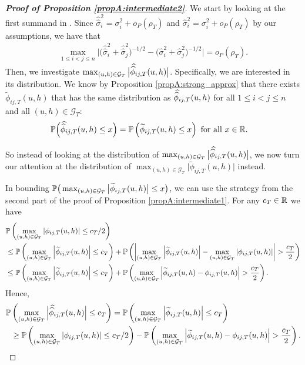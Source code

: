 \documentclass[a4paper,12pt]{article}
\makeatletter
\renewcommand{\eqref}[1]{\tagform@{\ref{#1}}}
\newcommand{\doublehat}[1]{\skew{5.5}\widehat{\widehat{#1}}}
\newcommand{\doublehattwo}[1]{\widehat{\widehat{#1}}}
\makeatother
\begin{document}
\begin{proof}[\textnormal{\textbf{Proof of Proposition \ref{propA:intermediate2}}}]
We start by looking at the first summand in \eqref{ineq-diff-1}. Since $\doublehattwo{\sigma}_i^2 = \sigma_i^2 + o_P(\rho_T)$ and $\widehat{\sigma}_i^2 = \sigma_i^2 + o_P(\rho_T)$ by our assumptions, we have that 
\begin{align}\label{ineq-diff-2}
\max_{1 \le i < j \le n} \Big|\big(\doublehattwo{\sigma}_i^2 + \doublehattwo{\sigma}_j^2 \big)^{-1/2} - \big(\widehat{\sigma}_i^2 + \widehat{\sigma}_j^2 \big)^{-1/2}\Big| = o_P(\rho_T).
\end{align}
Then, we investigate $ \max_{(u,h) \in \mathcal{G}_T} \big|\doublehat{\phi}_{ij,T}(u,h)\big|$. Specifically, we are interested in its distribution. We know by Proposition \ref{propA:strong_approx} that there exists $\widetilde{\phi}_{ij, T}(u, h)$ that has the same distribution as $\doublehat{\phi}_{ij,T}(u,h)$ for all $1\le i < j \le n$ and all $(u, h) \in \mathcal{G}_T$:
\begin{align*}
\pr&\Big(\doublehat{\phi}_{ij, T}(u, h) \leq x\Big) = \pr\left(\widetilde{\phi}_{ij, T}(u, h) \leq x\right) \text{ for all } x \in \reals.
\end{align*}

So instead of looking at the distribution of $ \max_{(u,h) \in \mathcal{G}_T} \big|\doublehat{\phi}_{ij,T}(u,h)\big|$, we now turn our attention at the distribution of $ \max_{(u,h) \in \mathcal{G}_T}\big|\widetilde{\phi}_{ij, T}(u, h)\big|$ instead.

In bounding $\mathbb{P}\big( \max_{(u,h) \in \mathcal{G}_T} \big| \widetilde{\phi}_{ij, T}(u, h) \big|\leq x\big)$, we can use the strategy from the second part of the proof of Proposition \ref{propA:intermediate1}. For any $c_T \in \mathbb{R}$ we have
\begin{align*}
&\mathbb{P}\left( \max_{(u,h) \in \mathcal{G}_T}\left|\phi_{ij, T}(u, h)\right| \leq c_T/2\right) \\
&\leq \mathbb{P}\left( \max_{(u,h) \in \mathcal{G}_T}\left|\widetilde{\phi}_{ij, T}(u, h)\right| \leq c_T\right) + \mathbb{P}\left(\left|\max_{(u,h) \in \mathcal{G}_T}\left|\widetilde{\phi}_{ij, T}(u, h)\right| - \max_{(u,h) \in \mathcal{G}_T}\left|\phi_{ij, T}(u, h)\right| \right| > \frac{c_T}{2}\right) \\
&\leq \mathbb{P}\left( \max_{(u,h) \in \mathcal{G}_T}\left|\widetilde{\phi}_{ij, T}(u, h)\right| \leq c_T\right) + \mathbb{P}\left(\max_{(u,h) \in \mathcal{G}_T}\left|\widetilde{\phi}_{ij, T}(u, h)- \phi_{ij, T}(u, h)\right| > \frac{c_T}{2}\right).
\end{align*}
Hence, 
\begin{align}\label{ineq-diff-3}
\begin{split}
\pr&\left(\max_{(u,h) \in \mathcal{G}_T}\Big|\doublehat{\phi}_{ij, T}(u, h)\Big| \leq c_T\right) = \pr\left(\max_{(u,h) \in \mathcal{G}_T}\left|\widetilde{\phi}_{ij, T}(u, h)\right| \leq c_T\right)\\
&\geq \pr\left( \max_{(u,h) \in \mathcal{G}_T}\left|\phi_{ij, T}(u, h)\right| \leq c_T/2\right) - \pr\left(\max_{(u,h) \in \mathcal{G}_T}\left|\widetilde{\phi}_{ij, T}(u, h)- \phi_{ij, T}(u, h)\right| > \frac{c_T}{2}\right).
\end{split}
\end{align}


\end{proof}
\end{document}
